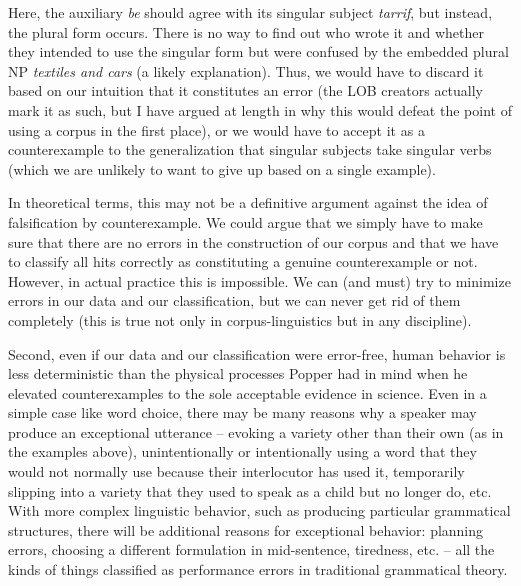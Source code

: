 Here, the auxiliary \textit{be} should agree with its singular  subject \textit{tarrif}, but instead, the plural form occurs. There is no way to find out who wrote it and whether they intended to use the singular form but were confused by the embedded plural NP \textit{textiles and cars} (a likely explanation). Thus, we would have to discard it based on our intuition  that it constitutes an error (the LOB creators actually mark it as such, but I have argued at length in  why this would defeat the point of using a corpus in the first place), or we would have to accept it as a counterexample  to the generalization that singular  subjects take singular verbs  (which we are unlikely to want to give up based on a single example).

In theoretical terms, this may not be a definitive argument against the idea of falsification  by counterexample.  We could argue that we simply have to make sure that there are no errors in the construction of our corpus and that we have to classify all hits  correctly as constituting a genuine counterexample or not. However, in actual practice this is impossible. We can (and must) try to minimize errors in our data and our classification, but we can never get rid of them completely (this is true not only in corpus\hyp{}linguistics but in any discipline).

Second, even if our data and our classification were error\hyp{}free, human behavior is less deterministic than the physical processes Popper had in mind when he elevated counterexamples  to the sole acceptable  evidence in science. Even in a simple case like word choice, there may be many reasons why a speaker may produce an exceptional utterance -- evoking a variety  other than their own (as in the examples above), unintentionally or intentionally using a word that they would not normally use because their interlocutor has used it, temporarily slipping into a variety that they used to speak as a child but no longer do, etc. With more complex  linguistic behavior, such as producing particular grammatical structures, there will be additional reasons for exceptional behavior: planning errors, choosing a different formulation in mid\hyp{}sentence, tiredness, etc. -- all the kinds of things classified as performance  errors in traditional grammatical theory.

